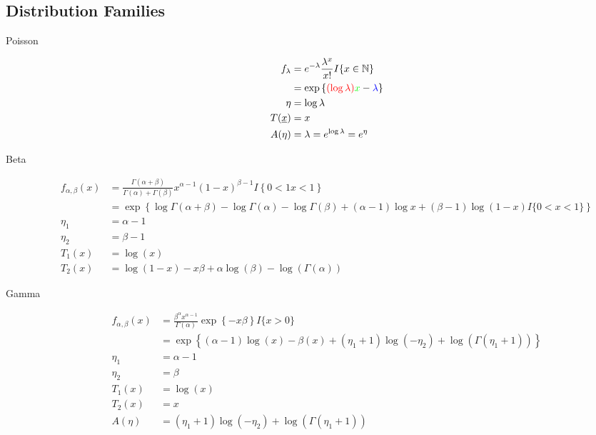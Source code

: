 \documentclass[11pt,fleqn]{book} %
\begin{document}
		\subsection{Distribution Families}
\begin{description}
	
		\item[Poisson] 
		
		\begin{align*}
		f_\lambda &= e^{-\lambda}\frac{\lambda^x }{x!} I\{x \in \mathbb{N} \} \\
			&= \exp \left\{\textcolor{red}{(\log\lambda)} \textcolor{green}{x}-\textcolor{blue}{\lambda} \right\}\\
		\eta &= \log\lambda\\
		T(\underline{x}) &= x\\
		A(\eta) &= \lambda = e^{\log\lambda}=e^\eta\\	
		\end{align*}


		\item[Beta] 
		\begin{align*}
		f_{\alpha,\beta}(x) &= \frac{\Gamma(\alpha+\beta)}{\Gamma(\alpha)+\Gamma(\beta)} x^{\alpha-1} (1-x)^{\beta-1} I\left\{0<1x<1 \right\}\\
			&=  \exp \left\{\log \Gamma(\alpha+\beta)-\log\Gamma(\alpha)-\log\Gamma(\beta)+(\alpha-1)\log x+(\beta-1)\log(1-x) I\{0<x<1\} \right\}\\
			\eta_1 &= \alpha-1\\
			\eta_2 &= \beta-1\\
			T_1(x) &= \log(x)\\
			T_2(x) &= \log(1-x)-x\beta+\alpha\log(\beta)-\log(\Gamma(\alpha))
		\end{align*}

		\item[Gamma] 
		\begin{align*}
			f_{\alpha,\beta}(x) &= \frac{\beta^\alpha x^{\alpha-1}}{\Gamma(\alpha)}\exp\left\{-x\beta \right\} I\{x>0\}\\
			&= \exp \left\{(\alpha-1)\log(x)-\beta(x) + (\eta_1+1)\log(-\eta_2)+\log(\Gamma(\eta_1+1))\right\}\\
			\eta_1 &= \alpha-1\\
			\eta_2 &= \beta\\
			T_1(x) &= \log(x)\\
			T_2(x) &= x\\
			A(\eta) &= (\eta_1+1)\log(-\eta_2)+\log(\Gamma(\eta_1+1))\\
		\end{align*} 
		

\end{description}
\end{document}
